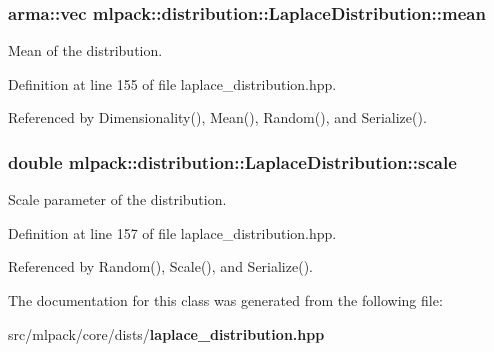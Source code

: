 \subsubsection[{mean}]{\setlength{\rightskip}{0pt plus 5cm}arma\+::vec mlpack\+::distribution\+::\+Laplace\+Distribution\+::mean\hspace{0.3cm}{\ttfamily [private]}}\label{classmlpack_1_1distribution_1_1LaplaceDistribution_a3e7efd65f6eb1cd156ba1b1562773b4b}


Mean of the distribution. 



Definition at line 155 of file laplace\+\_\+distribution.\+hpp.



Referenced by Dimensionality(), Mean(), Random(), and Serialize().

\subsubsection[{scale}]{\setlength{\rightskip}{0pt plus 5cm}double mlpack\+::distribution\+::\+Laplace\+Distribution\+::scale\hspace{0.3cm}{\ttfamily [private]}}\label{classmlpack_1_1distribution_1_1LaplaceDistribution_a8bbf1dcc34d9b5cebd1bc364f7d2cb65}


Scale parameter of the distribution. 



Definition at line 157 of file laplace\+\_\+distribution.\+hpp.



Referenced by Random(), Scale(), and Serialize().



The documentation for this class was generated from the following file\+:\begin{DoxyCompactItemize}
\item 
src/mlpack/core/dists/{\bf laplace\+\_\+distribution.\+hpp}\end{DoxyCompactItemize}
